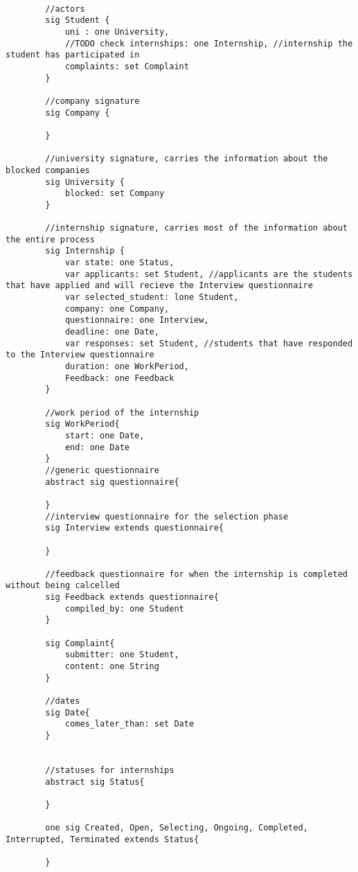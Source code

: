 \begin{lstlisting}[language=Alloy]
    
        //actors
        sig Student {
            uni : one University,
            //TODO check internships: one Internship, //internship the student has participated in
            complaints: set Complaint
        }
        
        //company signature
        sig Company {
            
        }
         
        //university signature, carries the information about the blocked companies
        sig University {
            blocked: set Company
        }
        
        //internship signature, carries most of the information about the entire process
        sig Internship {
            var state: one Status,
            var applicants: set Student, //applicants are the students that have applied and will recieve the Interview questionnaire
            var selected_student: lone Student,
            company: one Company,
            questionnaire: one Interview,
            deadline: one Date,
            var responses: set Student, //students that have responded to the Interview questionnaire
            duration: one WorkPeriod,
            Feedback: one Feedback
        }
        
        //work period of the internship
        sig WorkPeriod{
            start: one Date,
            end: one Date
        }
        //generic questionnaire
        abstract sig questionnaire{
            
        }
        //interview questionnaire for the selection phase
        sig Interview extends questionnaire{
            
        }
        
        //feedback questionnaire for when the internship is completed without being calcelled
        sig Feedback extends questionnaire{
            compiled_by: one Student
        }
        
        sig Complaint{
            submitter: one Student,
            content: one String
        }
        
        //dates 
        sig Date{
            comes_later_than: set Date
        }
        
        
        //statuses for internships
        abstract sig Status{
        
        }
        
        one sig Created, Open, Selecting, Ongoing, Completed, Interrupted, Terminated extends Status{
        
        }
        
        
       
\end{lstlisting}
